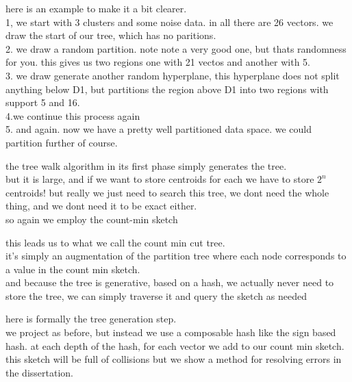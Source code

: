 \documentclass{beamer}
\begin{document}
\begin{frame}[plain]
here is an example to make it a bit clearer.\\
1, we start with 3 clusters and some noise data. in all there are 26 vectors.
we draw the start of our tree, which has no paritions.\\
2. we draw a random partition. note note a very good one, but thats randomness for you.
this gives us two regions one with 21 vectos and another with 5.\\
3. we draw generate another random hyperplane, this hyperplane does not split anything below
D1, but partitions the region above D1 into two regions with support 5 and 16.\\
4.we continue this process again\\
5. and again. now we have a pretty well partitioned data space. we could partition further
of course.
\end{frame}

\begin{frame}[plain]
the tree walk algorithm in its first phase simply generates the tree.\\
but it is large, and if we want to store centroids for each we have to store
$2^n$ centroids! but really we just need to search this tree, we dont need the whole
thing, and we dont need it to be exact either.\\
so again we employ the count-min sketch
\end{frame}

\begin{frame}[plain]
this leads us to what we call the count min cut tree. \\
it's simply an augmentation
of the partition tree where each node corresponds to a value in the count min sketch.\\

and because the tree is generative, based on a hash, we actually never need to store
the tree, we can simply traverse it and query the sketch as needed
\end{frame}

\begin{frame}[plain]
here is formally the tree generation step. \\
we project as before, but instead we
use a composable hash like the sign based hash. at each depth of the hash, for
each vector we add to our count min sketch. \\
this sketch will be full of collisions
but we show a method for resolving errors in the dissertation.
\end{frame}
\end{document}

